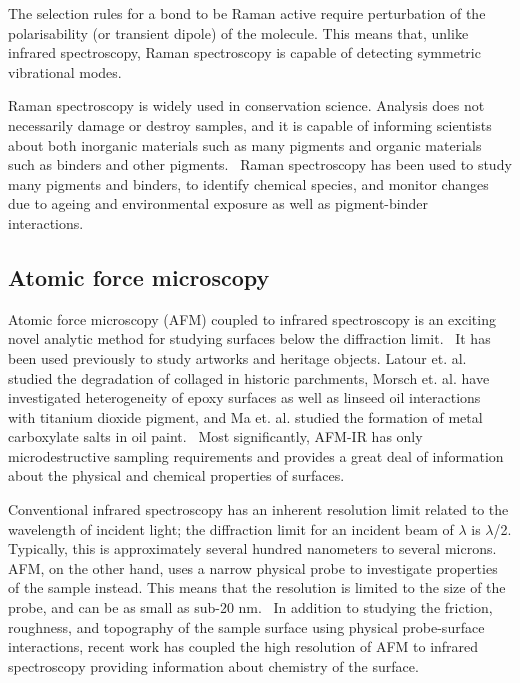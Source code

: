 The selection rules for a bond to be Raman active require perturbation of the polarisability (or transient dipole) of the molecule. This means that, unlike infrared spectroscopy, Raman spectroscopy is capable of detecting symmetric vibrational modes.~\autocite{2018RS,inphotonics}

Raman spectroscopy is widely used in conservation science. Analysis does not necessarily damage or destroy samples, and it is capable of informing scientists about both inorganic materials such as many pigments and organic materials such as binders and other pigments.~\autocite{conti_2016} Raman spectroscopy has been used to study many pigments and binders, to identify chemical species, and monitor changes due to ageing and environmental exposure as well as pigment-binder interactions.~\autocite{conti_2016,matousek_tissue,tomasini_raman,pallipurath2014,pallipurath2013,lazzari,vandenabeele} 

\subsection[Atomic force microscopy]{Atomic force microscopy}
\label{subsection1.2.2}

Atomic force microscopy (AFM) coupled to infrared spectroscopy is an exciting novel analytic method for studying surfaces below the diffraction limit.~\autocite{dazzi2017,kurouski} It has been used previously to study artworks and heritage objects. Latour et. al. studied the degradation of collaged in historic parchments, Morsch et. al. have investigated heterogeneity of epoxy surfaces as well as linseed oil interactions with titanium dioxide pigment, and Ma et. al. studied the formation of metal carboxylate salts in oil paint.~\autocite{latour,Morsch,morsch2016,ma} Most significantly, AFM-IR has only microdestructive sampling requirements and provides a great deal of information about the physical and chemical properties of surfaces.~\autocite{dazzi2017,kurouski}

Conventional infrared spectroscopy has an inherent resolution limit related to the wavelength of incident light; the diffraction limit for an incident beam of $\lambda$ is $\lambda$/2. Typically, this is approximately several hundred nanometers to several microns. AFM, on the other hand, uses a narrow physical probe to investigate properties of the sample instead. This means that the resolution is limited to the size of the probe, and can be as small as sub-20 nm.~\autocite{dazzi2017} In addition to studying the friction, roughness, and topography of the sample surface using physical probe-surface interactions, recent work has coupled the high resolution of AFM to infrared spectroscopy providing information about chemistry of the surface.~\autocite{dazzi2017,kurouski}

